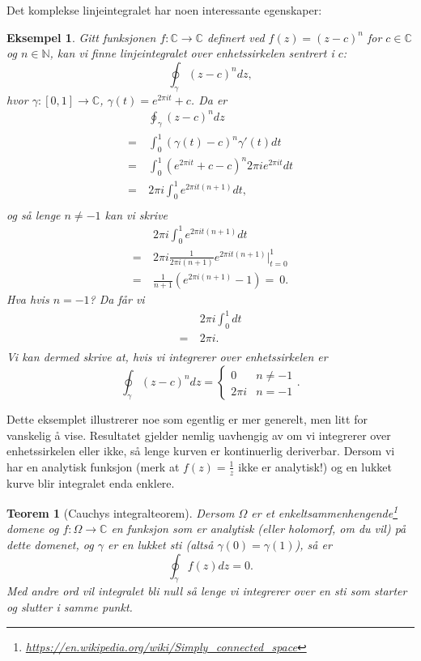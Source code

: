 \documentclass{article}
\newtheorem{theorem}{Teorem}
\newtheorem{example}{Eksempel}
\begin{document}
Det komplekse linjeintegralet har noen interessante egenskaper:
\begin{example}
    Gitt funksjonen $f:\mathbb{C} \longrightarrow \mathbb{C}$ definert ved $f(z) = (z-c)^n$ for $c \in \mathbb{C}$ og $n \in \mathbb{N}$, kan vi finne linjeintegralet over  enhetssirkelen sentrert i $c$:
    \[\oint_\gamma(z-c)^n dz,\]
    hvor $\gamma:[0, 1] \longrightarrow \mathbb{C}$, $\gamma(t) = e^{2\pi it} + c$. Da er
    \begin{align}
        & \oint_\gamma(z-c)^n dz \\
        =\ & \int_0^1(\gamma(t) - c)^n\gamma'(t) dt \\
        =\ & \int_0^1(e^{2\pi it} + c - c)^n2\pi i e^{2\pi it} dt \\
        =\ & 2\pi i \int_0^1 e^{2\pi it(n + 1)}dt, \\
    \end{align}
    og så lenge $n \neq -1$ kan vi skrive 
    \begin{align}
        & 2\pi i \int_0^1 e^{2\pi it(n + 1)}dt \\
        =\ & 2\pi i \frac{1}{2\pi i(n+1)}e^{2\pi it(n + 1)} \bigg\rvert_{t=0}^1 \\
        =\ & \frac{1}{n + 1} (e^{2\pi i(n + 1)} - 1)
        =\ 0.
    \end{align}
    Hva hvis $n = -1$? Da får vi
        \begin{align}
        & 2\pi i \int_0^1 dt \\
        =\ & 2\pi i. \\
    \end{align}
    Vi kan dermed skrive at, hvis vi integrerer over enhetssirkelen er 
    \[
        \oint_\gamma(z-c)^n dz = \begin{cases}
            0 & n \neq -1 \\
            2 \pi i & n = -1
        \end{cases}.
    \]
\end{example}

Dette eksemplet illustrerer noe som egentlig er mer generelt, men litt for vanskelig å vise. Resultatet gjelder nemlig uavhengig av om vi integrerer over enhetssirkelen eller ikke, så lenge kurven er kontinuerlig deriverbar. 
Dersom vi har en analytisk funksjon (merk at $f(z) = \frac{1}{z}$ ikke er analytisk!) og en lukket kurve blir integralet enda enklere.

\begin{theorem}[Cauchys integralteorem]
    Dersom $\Omega$ er et enkeltsammenhengende\footnote{\url{https://en.wikipedia.org/wiki/Simply_connected_space}} domene og $f:\Omega \longrightarrow \mathbb{C}$ en funksjon som er analytisk (eller holomorf, om du vil) på dette domenet, og $\gamma$ er en lukket sti (altså $\gamma(0) = \gamma(1)$), så er 
    \[
        \oint_\gamma f(z) dz = 0.
    \]
    Med andre ord vil integralet bli null så lenge vi integrerer over en sti som starter og slutter i samme punkt.
\end{theorem}
\end{document}
